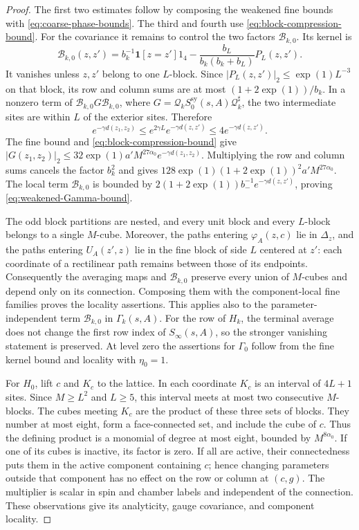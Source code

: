 \begin{proof}
The first two estimates follow by composing the weakened fine bounds
with \eqref{eq:coarse-phase-bounds}. The third and fourth use
\eqref{eq:block-compression-bound}. For the covariance it remains to
control the two factors $\mathcal B_{k,0}$. Its kernel is
\[
 \mathcal B_{k,0}(z,z')=b_k^{-1}\mathbf1[z=z']1_4
      -\frac{b_L}{b_k(b_k+b_L)}P_L(z,z').
\]
It vanishes unless $z,z'$ belong to one $L$-block. Since
$|P_L(z,z')|_2\le\exp(1)L^{-3}$ on that block, its row and column sums
are at most $(1+2\exp(1))/b_k$. In a nonzero term of
$\mathcal B_{k,0}G\mathcal B_{k,0}$,
where $G=\mathcal Q_kS_0^{\mathrm{sy}}(s,A)\mathcal Q_k^\sharp$,
the two intermediate sites are within $L$ of the exterior sites.
Therefore
\[
 e^{-\gamma d(z_1,z_2)}\le
      e^{2\gamma L}e^{-\gamma d(z,z')}
      \le4e^{-\gamma d(z,z')}.
\]
The fine bound and \eqref{eq:block-compression-bound} give
$|G(z_1,z_2)|_2\le32\exp(1)a'M^{27\alpha_0}e^{-\gamma d(z_1,z_2)}$.
Multiplying the row and column sums cancels the factor $b_k^2$ and
gives $128\exp(1)(1+2\exp(1))^2a'M^{27\alpha_0}$.
The local term $\mathcal B_{k,0}$ is bounded by
$2(1+2\exp(1))b_-^{-1}e^{-\gamma d(z,z')}$, proving
\eqref{eq:weakened-Gamma-bound}.

The odd block partitions are nested, and every unit block and every
$L$-block belongs to a single $M$-cube. Moreover, the paths entering
$\varphi_A(z,c)$ lie in $\Delta_z$, and the paths entering
$U_A(z',z)$ lie in the fine block of side $L$ centered at $z'$:
each coordinate of a rectilinear path remains between those of its
endpoints. Consequently the averaging maps and $\mathcal B_{k,0}$
preserve every union of $M$-cubes and depend only on its connection.
Composing them with the component-local fine families proves the
locality assertions. This applies also to the parameter-independent
term $\mathcal B_{k,0}$ in $\Gamma_k(s,A)$.
For the row of $H_k$, the terminal average does not change the first
row index of $S_\infty(s,A)$, so the stronger vanishing statement is
preserved. At level zero the assertions for $\Gamma_0$ follow
from the fine kernel bound and locality with $\eta_0=1$.

For $H_0$, lift $c$ and $K_c$ to the lattice. In each coordinate
$K_c$ is an interval of $4L+1$ sites. Since $M\ge L^2$ and $L\ge5$,
this interval meets at most two consecutive $M$-blocks. The cubes
meeting $K_c$ are the product of these three sets of blocks.
They number at most eight, form a face-connected set, and include
the cube of $c$. Thus the defining product is a monomial of degree
at most eight, bounded by $M^{8\alpha_0}$. If one of its cubes is
inactive, its factor is zero. If all are active, their connectedness
puts them in the active component containing $c$; hence changing
parameters outside that component has no effect on the row or
column at $(c,g)$. The multiplier is scalar in spin and chamber
labels and independent of the connection. These observations give
its analyticity, gauge covariance, and component locality.
\end{proof}


